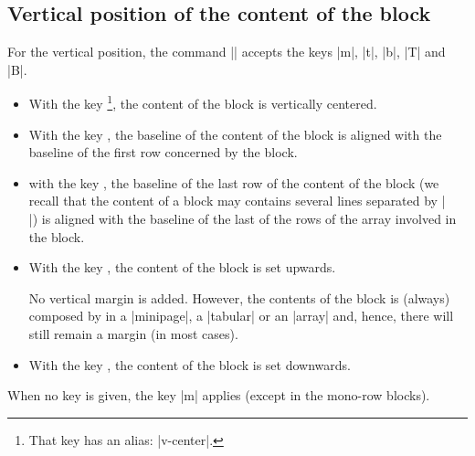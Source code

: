 \documentclass[dvipsnames]{article}%
\begin{document}
\subsection{Vertical position of the content of the block}

\label{vertical-pos-block}

For the vertical position, the command |\Blocks| accepts the keys
|m|, |t|, |b|, |T| and |B|.


\begin{itemize}
\item {}
With the key \footnote{That key has an alias: |v-center|.}, the content of the block is vertically centered.
\item With the key , the baseline of the content of the block is aligned
with the baseline of the first row concerned by the block.
\item with the key , the baseline of the last row of the content of the
block (we recall that the content of a block may contains several lines
separated by |\\|) is aligned with the baseline of the last of the rows of the
array involved in the block.
\item With the key , the content of the block is set upwards. 

No vertical margin is added. However, the contents of the block is (always)
composed by  in a |{minipage}|, a |{tabular}| or an |{array}|
and, hence, there will still remain a margin (in most cases).

\item With the key , the content of the block is set downwards.
\end{itemize}

When no key is given, the key |m| applies (except in the mono-row blocks).
\end{document}
